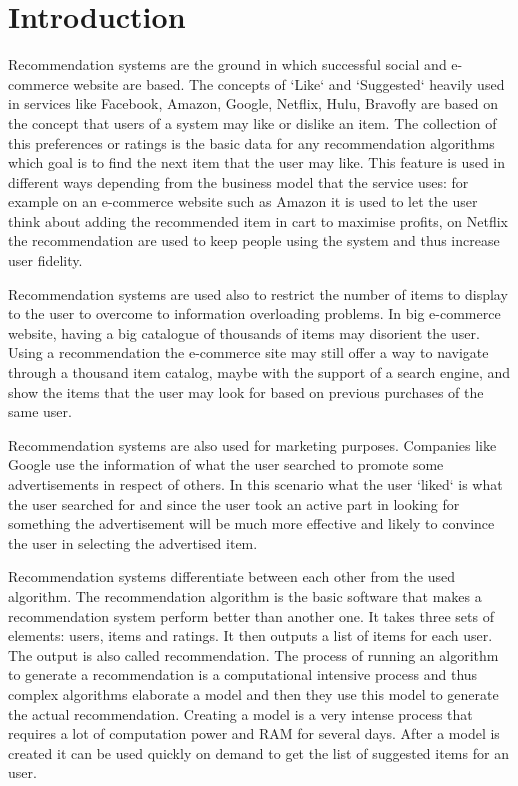 \chapter{Introduction}
\label{chapter:<Introduction>}

\acresetall

Recommendation systems are the ground in which successful social and e-commerce website are based. The concepts of `Like` and `Suggested` heavily used in services like Facebook, Amazon, Google, Netflix, Hulu, Bravofly are based on the concept that users of a system may like or dislike an item. The collection of this preferences or ratings is the basic data for any recommendation algorithms which goal is to find the next item that the user may like. This feature is used in different ways depending from the business model that the service uses: for example on an e-commerce website such as Amazon it is used to let the user think about adding the recommended item in cart to maximise profits, on Netflix the recommendation are used to keep people using the system and thus increase user fidelity.

Recommendation systems are used also to restrict the number of items to display to the user to overcome to information overloading problems. In big e-commerce website, having a big catalogue of thousands of items may disorient the user. Using a recommendation the e-commerce site may still offer a way to navigate through a thousand item catalog, maybe with the support of a search engine, and show the items that the user may look for based on previous purchases of the same user.

Recommendation systems are also used for marketing purposes. Companies like Google use the information of what the user searched to promote some advertisements in respect of others. In this scenario what the user `liked` is what the user searched for and since the user took an active part in looking for something the advertisement will be much more effective and likely to convince the user in selecting the advertised item.

Recommendation systems differentiate between each other from the used algorithm. The recommendation algorithm is the basic software that makes a recommendation system perform better than another one. It takes three sets of elements: users, items and ratings. It then outputs a list of items for each user. The output is also called recommendation. The process of running an algorithm to generate a recommendation is a computational intensive process and thus complex algorithms elaborate a model and then they use this model to generate the actual recommendation. Creating a model is a very intense process that requires a lot of computation power and RAM for several days. After a model is created it can be used quickly on demand to get the list of suggested items for an user.

